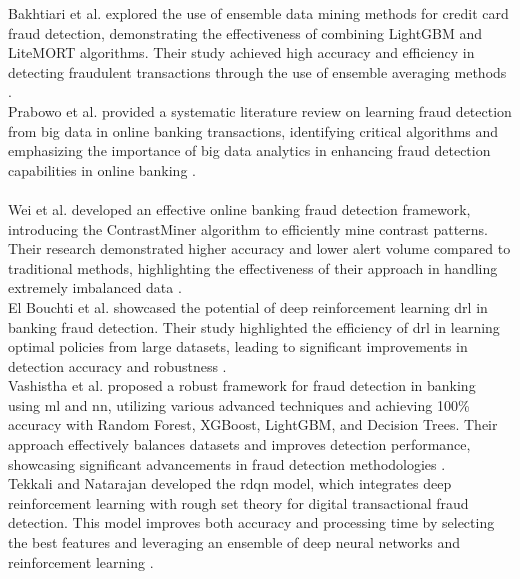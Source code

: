 \documentclass[12pt,a4paper]{report}
\begin{document}
Bakhtiari et al. explored the use of ensemble data mining methods for credit card fraud detection, demonstrating the effectiveness of combining LightGBM and LiteMORT algorithms. Their study achieved high accuracy and efficiency in detecting fraudulent transactions through the use of ensemble averaging methods \citep[p. 29057]{bakhtiari2023credit}.\\

Prabowo et al. provided a systematic literature review on learning fraud detection from big data in online banking transactions, identifying critical algorithms and emphasizing the importance of big data analytics in enhancing fraud detection capabilities in online banking \citep[p. 127]{prabowo2016learning}.\\
\\

Wei et al. developed an effective online banking fraud detection framework, introducing the ContrastMiner algorithm to efficiently mine contrast patterns. Their research demonstrated higher accuracy and lower alert volume compared to traditional methods, highlighting the effectiveness of their approach in handling extremely imbalanced data \citep[p. 449]{wei2013effective}.\\

El Bouchti et al. showcased the potential of deep reinforcement learning \acrshort{drl} in banking fraud detection. Their study highlighted the efficiency of \acrshort{drl} in learning optimal policies from large datasets, leading to significant improvements in detection accuracy and robustness \citep[p. 58]{el2017fraud}.\\

Vashistha et al. proposed a robust framework for fraud detection in banking using \acrshort{ml} and \acrshort{nn}, utilizing various advanced techniques and achieving 100\% accuracy with Random Forest, XGBoost, LightGBM, and Decision Trees. Their approach effectively balances datasets and improves detection performance, showcasing significant advancements in fraud detection methodologies \citep[p. 201]{vashistha2024robust}.\\

Tekkali and Natarajan developed the \acrshort{rdqn} model, which integrates deep reinforcement learning with rough set theory for digital transactional fraud detection. This model improves both accuracy and processing time by selecting the best features and leveraging an ensemble of deep neural networks and reinforcement learning \citep[p. 5313]{tekkali2023rdqn}.
\end{document}
